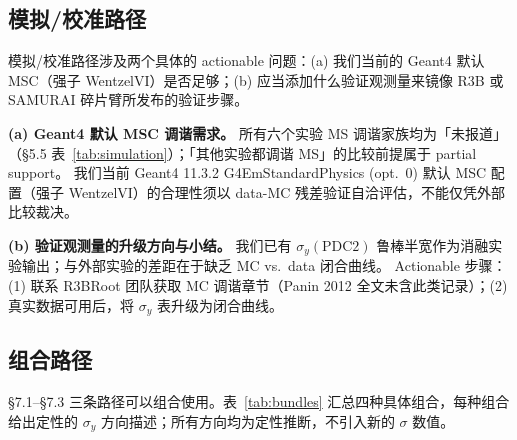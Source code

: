 \documentclass[a4paper, 11pt]{article}
\begin{document}
\subsection{模拟/校准路径}
\label{sec:impl_simcalib}

模拟/校准路径涉及两个具体的 actionable 问题：(a) 我们当前的 Geant4 默认 MSC（强子 WentzelVI）是否足够；(b) 应当添加什么验证观测量来镜像 R3B 或 SAMURAI 碎片臂所发布的验证步骤。

\textbf{(a) Geant4 默认 MSC 调谐需求。}
所有六个实验 MS 调谐家族均为「未报道」（§5.5 表~\ref{tab:simulation}）；「其他实验都调谐 MS」的比较前提属于 partial support。
我们当前 Geant4 11.3.2 G4EmStandardPhysics (opt.~0) 默认 MSC 配置（强子 WentzelVI）的合理性须以 data-MC 残差验证自洽评估，不能仅凭外部比较裁决。

\textbf{(b) 验证观测量的升级方向与小结。}
我们已有 $\sigma_y(\text{PDC2})$ 鲁棒半宽作为消融实验输出；与外部实验的差距在于缺乏 MC vs.\ data 闭合曲线。
Actionable 步骤：(1) 联系 R3BRoot 团队获取 MC 调谐章节（Panin 2012 全文未含此类记录）；(2) 真实数据可用后，将 $\sigma_y$ 表升级为闭合曲线。

\subsection{组合路径}
\label{sec:impl_bundles}

§7.1--§7.3 三条路径可以组合使用。表~\ref{tab:bundles} 汇总四种具体组合，每种组合给出定性的 $\sigma_y$ 方向描述；所有方向均为定性推断，不引入新的 $\sigma$ 数值。
\end{document}

